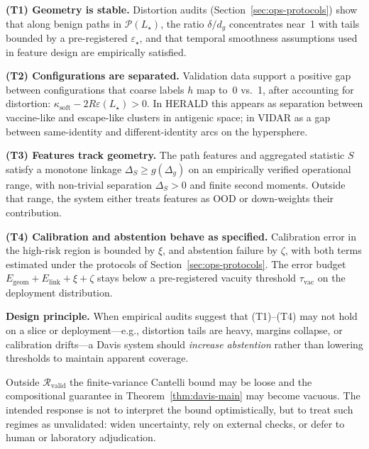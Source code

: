 \documentclass[11pt]{article}
\begin{document}
\medskip\noindent
\textbf{(T1) Geometry is stable.} Distortion audits (Section~\ref{sec:ops-protocols}) show that along
benign paths in $\mathcal{P}(L_\star)$, the ratio $\delta/d_g$ concentrates near~1 with tails bounded
by a pre-registered $\varepsilon_\star$, and that temporal smoothness assumptions used in
feature design are empirically satisfied.

\medskip\noindent
\textbf{(T2) Configurations are separated.} Validation data support a positive gap between
configurations that coarse labels $h$ map to~0 vs.~1, after accounting for distortion:
$\kappa_{\mathrm{soft}} - 2R\varepsilon(L_\star) > 0$. In HERALD this appears as separation
between vaccine-like and escape-like clusters in antigenic space; in VIDAR as a gap between
same-identity and different-identity arcs on the hypersphere.

\medskip\noindent
\textbf{(T3) Features track geometry.} The path features and aggregated statistic $S$ satisfy a
monotone linkage $\Delta_S \ge g(\Delta_g)$ on an empirically verified operational range, with
non-trivial separation $\Delta_S > 0$ and finite second moments. Outside that range, the system
either treats features as OOD or down-weights their contribution.

\medskip\noindent
\textbf{(T4) Calibration and abstention behave as specified.} Calibration error in the high-risk
region is bounded by $\xi$, and abstention failure by $\zeta$, with both terms estimated under the
protocols of Section~\ref{sec:ops-protocols}. The error budget
$E_{\mathrm{geom}} + E_{\mathrm{link}} + \xi + \zeta$ stays below a pre-registered vacuity threshold
$\tau_{\mathrm{vac}}$ on the deployment distribution.

\begin{mdframed}
\textbf{Design principle.} When empirical audits suggest that (T1)--(T4) may not hold on a slice or
deployment---e.g., distortion tails are heavy, margins collapse, or calibration drifts---a Davis system
should \emph{increase abstention} rather than lowering thresholds to maintain apparent coverage.
\end{mdframed}

Outside $\mathcal{R}_{\mathrm{valid}}$ the finite-variance Cantelli bound may be loose and the compositional
guarantee in Theorem~\ref{thm:davis-main} may become vacuous. The intended response is not to
interpret the bound optimistically, but to treat such regimes as unvalidated: widen uncertainty,
rely on external checks, or defer to human or laboratory adjudication.
\end{document}
